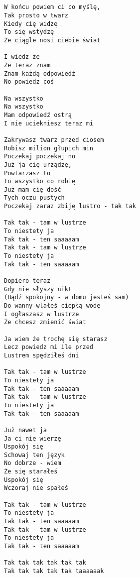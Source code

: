 \documentclass[12pt]{article}
\begin{document}
\subsection*{}
\begin{verbatim}
W końcu powiem ci co myślę,
Tak prosto w twarz
Kiedy cię widzę
To się wstydzę
Że ciągle nosi ciebie świat

I wiedz że
Że teraz znam
Znam każdą odpowiedź
No powiedz coś

Na wszystko
Na wszystko
Mam odpowiedź ostrą
I nie uciekniesz teraz mi

Zakrywasz twarz przed ciosem
Robisz milion głupich min
Poczekaj poczekaj no
Już ja cię urządzę,
Powtarzasz to
To wszystko co robię
Już mam cię dość
Tych oczu pustych
Poczekaj zaraz zbiję lustro - tak tak

Tak tak - tam w lustrze
To niestety ja
Tak tak - ten saaaaam
Tak tak - tam w lustrze
To niestety ja
Tak tak - ten saaaaam

Dopiero teraz
Gdy nie słyszy nikt
(Bądź spokojny - w domu jesteś sam)
Do wanny wlałeś ciepłą wodę
I ogłaszasz w lustrze
Że chcesz zmienić świat

Ja wiem że trochę się starasz
Lecz powiedz mi ile przed
Lustrem spędziłeś dni

Tak tak - tam w lustrze
To niestety ja
Tak tak - ten saaaaam
Tak tak - tam w lustrze
To niestety ja
Tak tak - ten saaaaam

Już nawet ja
Ja ci nie wierzę
Uspokój się
Schowaj ten język
No dobrze - wiem
Że się starałeś
Uspokój się
Wczoraj nie spałeś

Tak tak - tam w lustrze
To niestety ja
Tak tak - ten saaaaam
Tak tak - tam w lustrze
To niestety ja
Tak tak - ten saaaaam

Tak tak tak tak tak tak
Tak tak tak tak tak taaaaaak
\end{verbatim}
\clearpage
\end{document}
